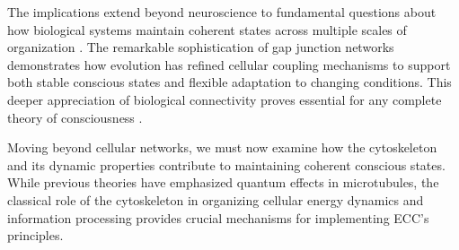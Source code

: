The implications extend beyond neuroscience to fundamental questions about how biological systems maintain coherent states across multiple scales of organization \cite{Giaume1996}. The remarkable sophistication of gap junction networks demonstrates how evolution has refined cellular coupling mechanisms to support both stable conscious states and flexible adaptation to changing conditions. This deeper appreciation of biological connectivity proves essential for any complete theory of consciousness \cite{Hormuzdi2004}.

Moving beyond cellular networks, we must now examine how the cytoskeleton and its dynamic properties contribute to maintaining coherent conscious states. While previous theories have emphasized quantum effects in microtubules, the classical role of the cytoskeleton in organizing cellular energy dynamics and information processing provides crucial mechanisms for implementing ECC's principles.